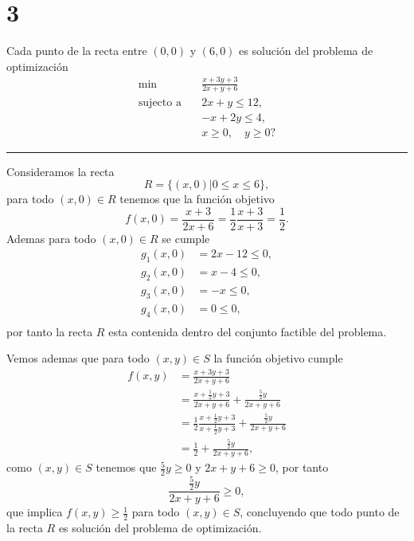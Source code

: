 \section*{3}

Cada punto de la recta entre $(0,0)$ y $(6,0)$ es solución del problema de optimización
\begin{equation*}
\begin{aligned}
    \min \quad & \frac{x + 3 y + 3}{2 x + y + 6} \\
    \text{sujecto a} \quad & 2 x + y \leq 12, \\
        & -x + 2 y \leq 4, \\
        & x \geq 0, \quad y \geq 0?
\end{aligned}
\end{equation*}

\noindent\rule{10cm}{0.4pt}

Consideramos la recta
\begin{equation*}
    R = \{ (x, 0) | 0 \leq x \leq 6 \},
\end{equation*}
para todo $(x, 0) \in R$ tenemos que la función objetivo
\begin{equation*}
    f(x, 0) = \frac{x + 3}{2 x + 6} = \frac{1}{2} \frac{x + 3}{x + 3} = \frac{1}{2}.
\end{equation*}
Ademas para todo $(x, 0) \in R$ se cumple
\begin{equation*}
\begin{aligned}
    g_1(x, 0) & = 2 x - 12 \leq 0, \\
    g_2(x, 0) & = x - 4 \leq 0, \\
    g_3(x, 0) & = -x \leq 0, \\
    g_4(x, 0) & = 0 \leq 0, \\
\end{aligned}
\end{equation*}
por tanto la recta $R$ esta contenida dentro del conjunto factible del problema.

Vemos ademas que para todo $(x, y) \in S$ la función objetivo cumple
\begin{equation*}
\begin{aligned}
    f(x, y) 
        & = \frac{x + 3 y + 3}{2 x + y + 6} \\
        & = \frac{x + \frac{1}{2} y + 3}{2 x + y + 6} + \frac{\frac{5}{2} y}{2 x + y + 6} \\
        & = \frac{1}{2} \frac{x + \frac{1}{2} y + 3}{x + \frac{1}{2} y + 3} + \frac{\frac{5}{2} y}{2 x + y + 6} \\
        & = \frac{1}{2} + \frac{\frac{5}{2} y}{2 x + y + 6},
\end{aligned}
\end{equation*}
como $(x,y) \in S$ tenemos que $\frac{5}{2} y \geq 0$ y $2 x + y + 6 \geq 0$,
por tanto
\begin{equation*}
        \frac{\frac{5}{2} y}{2 x + y + 6} \geq 0,
\end{equation*}
que implica $f(x, y) \geq \frac{1}{2}$ para todo $(x, y) \in S$,
concluyendo que todo punto de la recta $R$ es solución del problema de optimización.